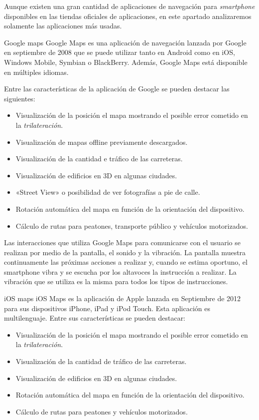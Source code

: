 Aunque existen una gran cantidad de aplicaciones de navegación para \emph{smartphone} disponibles en
las tiendas oficiales de aplicaciones, en este apartado analizaremos solamente las aplicaciones más
usadas.

\begin{definitionlist}
  \item[Google maps] Google Maps es una aplicación de navegación lanzada por Google en septiembre de
    2008 que se puede utilizar tanto en Android como en iOS, Windows Mobile, Symbian o
    BlackBerry. Además, Google Maps está disponible en múltiples idiomas.

    Entre las características de la aplicación de Google se pueden destacar las siguientes:

    \begin{itemize}
      \item Visualización de la posición el mapa mostrando el posible error cometido en la
        \emph{trilateración}.
      \item Visualización de mapas offline previamente descargados.
      \item Visualización de la cantidad e tráfico de las carreteras.
      \item Visualización de edificios en 3D en algunas ciudades.
      \item «Street View» o posibilidad de ver fotografías a pie de calle.
      \item Rotación automática del mapa en función de la orientación del dispositivo.
      \item Cálculo de rutas para peatones, transporte público y vehículos motorizados.
    \end{itemize}

    Las interacciones que utiliza Google Maps para comunicarse con el usuario se realizan por medio
    de la pantalla, el sonido y la vibración. La pantalla muestra continuamente las próximas
    acciones a realizar y, cuando se estima oportuno, el smartphone vibra y se escucha por los
    altavoces la instrucción a realizar. La vibración que se utiliza es la misma para todos los
    tipos de instrucciones.

  \item[iOS maps] iOS Maps es la aplicación de Apple lanzada en Septiembre de 2012 para sus
    dispositivos iPhone, iPad y iPod Touch. Esta aplicación es multilenguaje. Entre sus
    características se pueden destacar:

    \begin{itemize}
      \item Visualización de la posición el mapa mostrando el posible error cometido en la
        \emph{trilateración}.
      \item Visualización de la cantidad de tráfico de las carreteras.
      \item Visualización de edificios en 3D en algunas ciudades.
      \item Rotación automática del mapa en función de la orientación del dispositivo.
      \item Cálculo de rutas para peatones y vehículos motorizados.
    \end{itemize}


\end{definitionlist}
